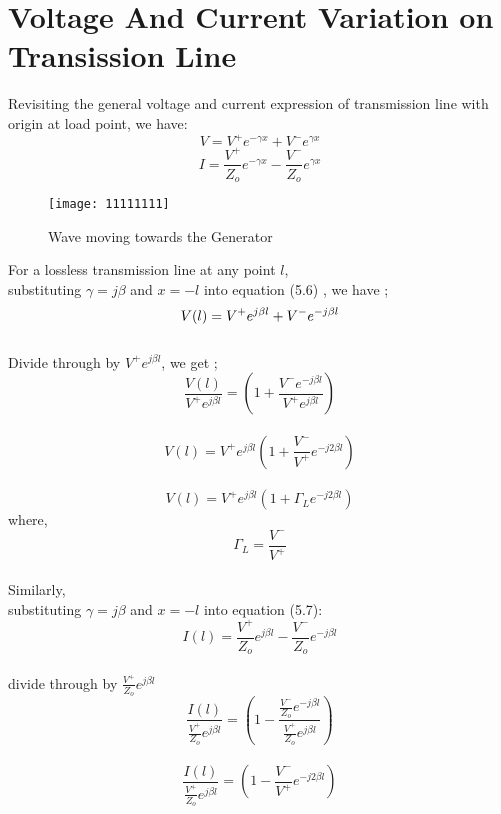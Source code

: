 	\section{Voltage And Current Variation on Transission Line}
	
	Revisiting the general voltage and current expression of transmission line with origin  at load point, we have:
	\begin{equation}
	V =  V^+ e^{- \gamma x} + V^- e^{\gamma x}
	\end{equation}
	\begin{equation}
	I= \frac{V^+}{Z_o} e^{- \gamma x} - \frac{V^-}{Z_o} e^{\gamma x}
	\end{equation}
	\begin{figure}[h]
		\centering
		\texttt{[image: 11111111]}
		\caption{Wave moving towards the Generator}
		\label{fig:11111111}
	\end{figure}
	
For a lossless transmission line at any point $l$,\\
substituting $\gamma = j\beta$ and $x=-l$ into equation (5.6) , we have ;
	\begin{equation*}\\
	V(l) = V^+ e^{j \beta l} + V^- e^{- j \beta l}
	\end{equation*}\\
	Divide through by $ V^+ e^{j \beta l}$, we get ;\\
	\begin{equation*}
	\frac{V(l)}{ V^+ e^{j \beta l}}= (1 +\frac{V^- e^{- j \beta l}}{V^+ e^{j \beta l}})
	\end{equation*}\\
	\begin{equation*}
	V(l) = V^+ e^{j \beta l}(1+ \frac{V^-}{V^+}e^{-j 2 \beta l})
	\end{equation*}\\
	\begin{equation}
	V(l) = V^+ e^{j \beta l}(1 + \Gamma_L e^{-j 2 \beta l})
	\end{equation}
	where,\\
	\begin{equation*}
	\Gamma _L = \frac{V^-}{V^+}
	\end{equation*}\\
	Similarly,\\
	 substituting $\gamma = j\beta$ and $x = -l$ into equation (5.7):
	\begin{equation*}
	I(l) = \frac{V^+}{Z_o}  e^{j \beta l} - \frac{V^-}{Z_o} e^{-j \beta l}
	\end{equation*}\\
	divide through by $\frac{V^+}{Z_o}  e^{j \beta l}$\\ 
	\begin{equation*}
	\frac{I(l)}{\frac{V^+}{Z_o}  e^{j \beta l}} =( 1- \frac{\frac{V^-}{Z_o} e^{-j \beta l}}{\frac{V^+}{Z_o}  e^{j \beta l}} )
	\end{equation*}\\
	\begin{equation*}
	\frac{I(l)}{\frac{V^+}{Z_o}  e^{j \beta l}} =( 1-  \frac{V^-}{V^+}e^{-j 2 \beta l})
	\end{equation*}\\

